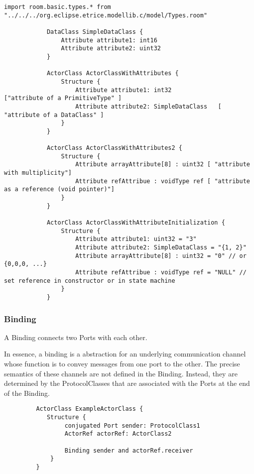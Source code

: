 			\begin{lstlisting}[language=ROOM]
			import room.basic.types.* from "../../../org.eclipse.etrice.modellib.c/model/Types.room"
			
			DataClass SimpleDataClass {
				Attribute attribute1: int16
				Attribute attribute2: uint32
			}
		
			ActorClass ActorClassWithAttributes {
				Structure {
					Attribute attribute1: int32 			["attribute of a PrimitiveType" ]
					Attribute attribute2: SimpleDataClass 	[ "attribute of a DataClass" ]
				}
			}
		
			ActorClass ActorClassWithAttributes2 {
				Structure {
					Attribute arrayAttribute[8] : uint32 [ "attribute with multiplicity"]
					Attribute refAttribue : voidType ref [ "attribute as a reference (void pointer)"]
				}
			}
		
			ActorClass ActorClassWithAttributeInitialization {
				Structure {
					Attribute attribute1: uint32 = "3"
					Attribute attribute2: SimpleDataClass = "{1, 2}"
					Attribute arrayAttribute[8] : uint32 = "0" // or {0,0,0, ...}
					Attribute refAttribue : voidType ref = "NULL" // set reference in constructor or in state machine
				}
			}
			\end{lstlisting}
	
	\vspace{\baselineskip}
	\vspace{\baselineskip}
	\vspace{\baselineskip}
	
\subsubsection{Binding}
	\hypertarget{ref:Binding}{}
	A Binding connects two Ports with each other.
		
		In essence, a binding is a abstraction for an underlying communication channel whose function is to convey messages from one port to the other.
		The precise semantics of these channels are not defined in the Binding. Instead, they are determined by the ProtocolClasses that are associated with the Ports at the end of the Binding.
	
		\begin{lstlisting}
		 ActorClass ExampleActorClass {
			Structure {
				 conjugated Port sender: ProtocolClass1
				 ActorRef actorRef: ActorClass2
				 
				 Binding sender and actorRef.receiver
			 }
		 }
		 \end{lstlisting}
		
